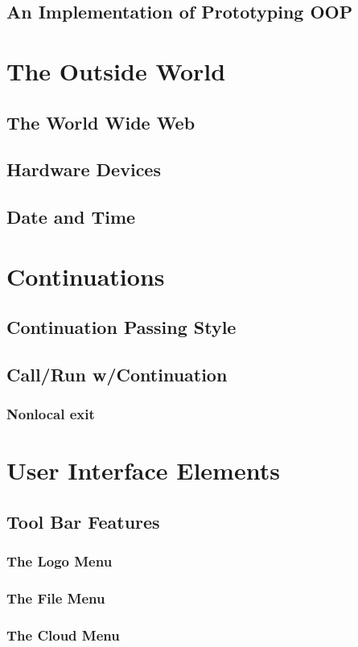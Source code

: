 \documentclass[a4paper]{report}
\begin{document}
\section{An Implementation of Prototyping OOP}
\chapter{The Outside World}
\section{The World Wide Web}
\section{Hardware Devices}
\section{Date and Time}
\chapter{Continuations}
\section{Continuation Passing Style}
\section{Call/Run w/Continuation}
\subsection{Nonlocal exit}
\chapter{User Interface Elements}
\section{Tool Bar Features}
\subsection{The \Snap{} Logo Menu}
\subsection{The File Menu}
\subsection{The Cloud Menu}
\end{document}
